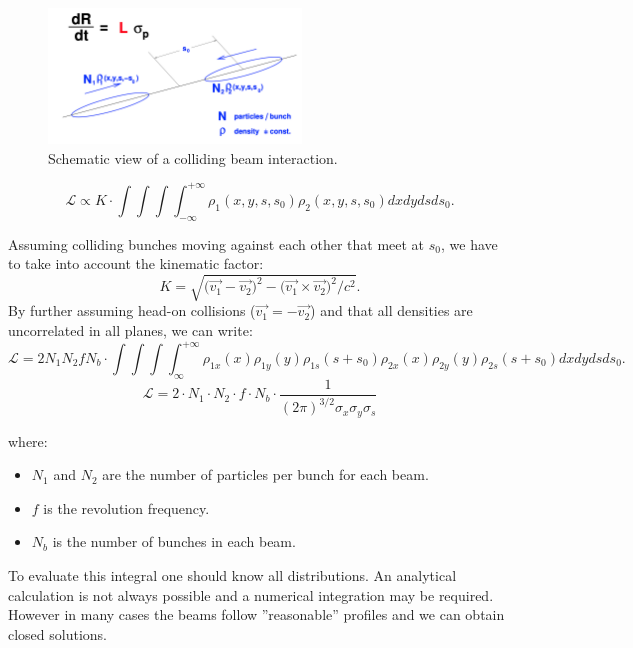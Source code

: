 \begin{figure}
    \centering
    \includegraphics[width=0.6\textwidth]{figures/luminosity_def.png}
    \caption{Schematic view of a colliding beam interaction.}
    \label{fig:lumi-def}
\end{figure}

\begin{equation}
    \mathcal{L} \propto K\cdot\int\int\int\int_{-\infty}^{+\infty}\rho_1(x,y,s,s_0)\rho_2(x,y,s,s_0)dxdydsds_0.
\end{equation}

Assuming colliding bunches moving against each other that meet at $s_0$, we have to take into account the kinematic factor:
\begin{equation}
    K = \sqrt{\bigl(\vec{v_1}-\vec{v_2}\bigr)^2-\bigl(\vec{v_1} \times \vec{v_2}\bigr)^2/c^2}.
\end{equation}
By further assuming head-on collisions ($\vec{v_1}=-\vec{v_2}$) and that all densities are uncorrelated in all planes, we can write:
\begin{equation}
        \mathcal{L} = 2 N_1 N_2 f N_b\cdot\int\int\int\int_{\infty}^{+\infty}\rho_{1x}(x)\rho_{1y}(y)\rho_{1s}(s+s_0)\rho_{2x}(x)\rho_{2y}(y)\rho_{2s}(s+s_0)dxdydsds_0.
\end{equation}
\[
\mathcal{L} = 2 \cdot N_1 \cdot N_2 \cdot f \cdot N_b \cdot \frac{1}{(2 \pi)^{3/2} \sigma_x \sigma_y \sigma_s}
\]

where:
\begin{itemize}
    \item \( N_1 \) and \( N_2 \) are the number of particles per bunch for each beam.
    \item \( f \) is the revolution frequency.
    \item \( N_b \) is the number of bunches in each beam.
\end{itemize}

To evaluate this integral one should know all distributions. An analytical calculation is not always possible and a numerical integration may be required. However in many cases the beams follow ”reasonable” profiles and we can obtain closed solutions.


